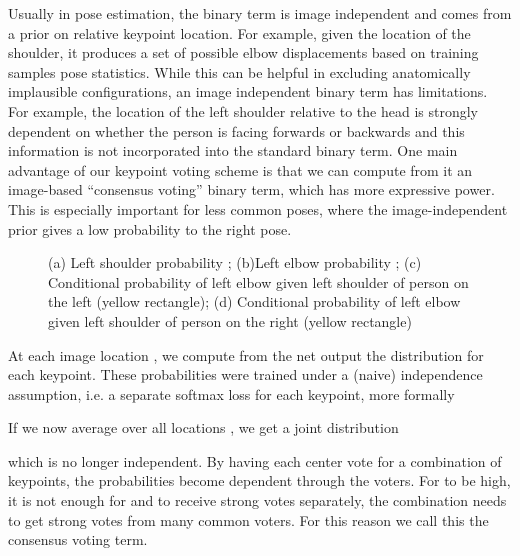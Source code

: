 \documentclass{article}
\begin{document}
Usually in pose estimation, the binary term is image independent and comes from a prior on relative keypoint location. For example, given the location of the shoulder, it produces a set of possible elbow displacements based on training samples pose statistics. While this can be helpful in excluding anatomically implausible configurations, an image independent binary term has limitations. For example, the location of the left shoulder relative to the head is strongly dependent on whether the person is facing forwards or backwards and this information is not incorporated into the standard binary term. One main advantage of our keypoint voting scheme is that we can compute from it an image-based ``consensus voting'' binary term, which has more expressive power. This is especially important for less common poses, where the image-independent prior gives a low probability to the right pose. \\

\begin{figure}[ht]
	\centering
	\quad
	
	\quad
\caption{(a) Left shoulder probability ; (b)Left elbow probability ; (c) Conditional probability of left elbow given left shoulder of person on the left (yellow rectangle); (d) Conditional probability of left elbow given left shoulder of person on the right (yellow rectangle)}
	\label{fig:conditional-probability-all}
\end{figure}

At each image location , we compute from the net output the distribution  for each keypoint. These probabilities were trained under a (naive) independence assumption, i.e. a separate softmax loss for each keypoint, more formally 


If we now average over all locations , we get a joint distribution 
\label{eq:objective}

which is no longer independent. By having each center  vote for a combination of keypoints, the probabilities become dependent through the voters. For  to be high, it is not enough for  and  to receive strong votes separately, the combination needs to get strong votes from many common voters. For this reason we call this the consensus voting term.\\
\end{document}
